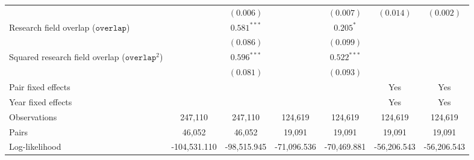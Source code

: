 \begin{tabular}{l c c c c c c}
& & $(0.006)$ & & $(0.007)$ & $(0.014)$ & $(0.002)$ \\
Research field overlap ($\mathtt{overlap}$) & & $0.581^{***}$ & & $0.205^{*}$ & & \\
& & $(0.086)$ & & $(0.099)$ & & \\
Squared research field overlap ($\mathtt{overlap}^2$) & & $0.596^{***}$ & & $0.522^{***}$ & & \\
& & $(0.081)$ & & $(0.093)$ & & \\
Pair fixed effects & & & & & Yes & Yes \\
Year fixed effects & & & & & Yes & Yes \\
\midrule
Observations & 247,110 & 247,110 & 124,619 & 124,619 & 124,619 & 124,619 \\
\quad Pairs & 46,052 & 46,052 & 19,091 & 19,091 & 19,091 & 19,091 \\
Log-likelihood & -104,531.110 & -98,515.945 & -71,096.536 & -70,469.881 & -56,206.543 & -56,206.543 \\
\bottomrule
\end{tabular}
